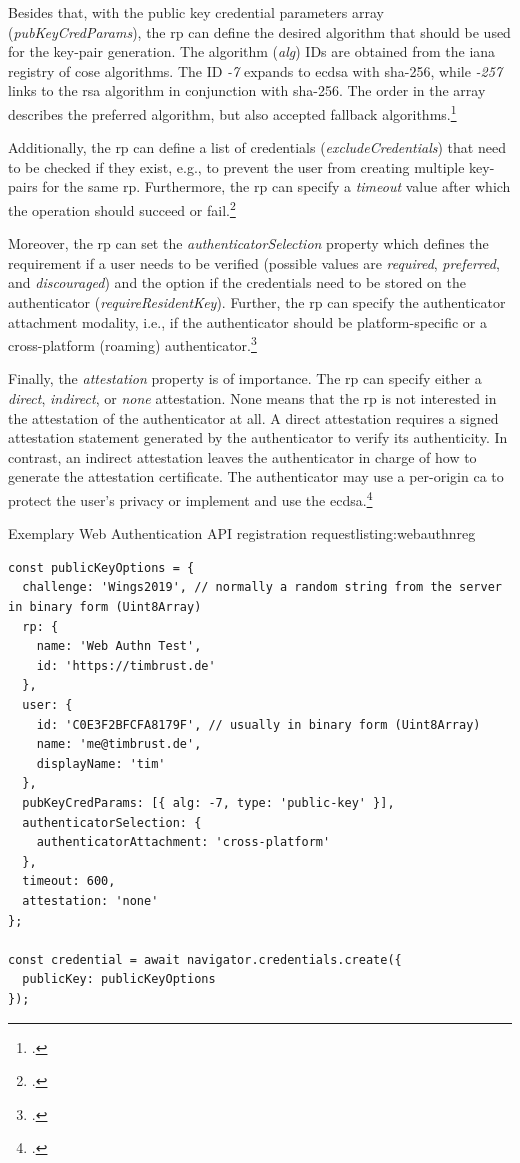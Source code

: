 Besides that, with the public key credential parameters array (\textit{pubKeyCredParams}), the \gls{rp} can define the desired algorithm that should be used for the key-pair generation. The algorithm (\textit{alg}) IDs are obtained from the \gls{iana} registry of \gls{cose} algorithms. The ID \textit{-7} expands to \gls{ecdsa} with \gls{sha}-256, while \textit{-257} links to the \gls{rsa} algorithm in conjunction with \gls{sha}-256. The order in the array describes the preferred algorithm, but also accepted fallback algorithms.\footcites[See][Chapter 5.3, 11.3]{w3c}

Additionally, the \gls{rp} can define a list of credentials (\textit{excludeCredentials}) that need to be checked if they exist, e.g., to prevent the user from creating multiple key-pairs for the same \gls{rp}. Furthermore, the \gls{rp} can specify a \textit{timeout} value after which the operation should succeed or fail.\footcites[See][Chapter 5.4]{w3c}

Moreover, the \gls{rp} can set the \textit{authenticatorSelection} property which defines the requirement if a user needs to be verified (possible values are \textit{required}, \textit{preferred}, and \textit{discouraged}) and the option if the credentials need to be stored on the authenticator (\textit{requireResidentKey}). Further, the \gls{rp} can specify the authenticator attachment modality, i.e., if the authenticator should be platform-specific or a cross-platform (roaming) authenticator.\footcites[See][Chapter 6.2.1]{w3c}

Finally, the \textit{attestation} property is of importance. The \gls{rp} can specify either a \textit{direct}, \textit{indirect}, or \textit{none} attestation. None means that the \gls{rp} is not interested in the attestation of the authenticator at all. A direct attestation requires a signed attestation statement generated by the authenticator to verify its authenticity. In contrast, an indirect attestation leaves the authenticator in charge of how to generate the attestation certificate. The authenticator may use a per-origin \gls{ca} to protect the user's privacy or implement and use the \gls{ecdsa}.\footcites[See][Chapter 5.4.6]{w3c}

\begin{example}{Exemplary Web Authentication API registration request}{listing:webauthnreg}
\begin{verbatim}
const publicKeyOptions = {
  challenge: 'Wings2019', // normally a random string from the server in binary form (Uint8Array)
  rp: {
    name: 'Web Authn Test',
    id: 'https://timbrust.de'
  },
  user: {
    id: 'C0E3F2BFCFA8179F', // usually in binary form (Uint8Array)
    name: 'me@timbrust.de',
    displayName: 'tim'
  },
  pubKeyCredParams: [{ alg: -7, type: 'public-key' }],
  authenticatorSelection: {
    authenticatorAttachment: 'cross-platform'
  },
  timeout: 600,
  attestation: 'none'
};

const credential = await navigator.credentials.create({
  publicKey: publicKeyOptions
});
\end{verbatim}
\end{example}

